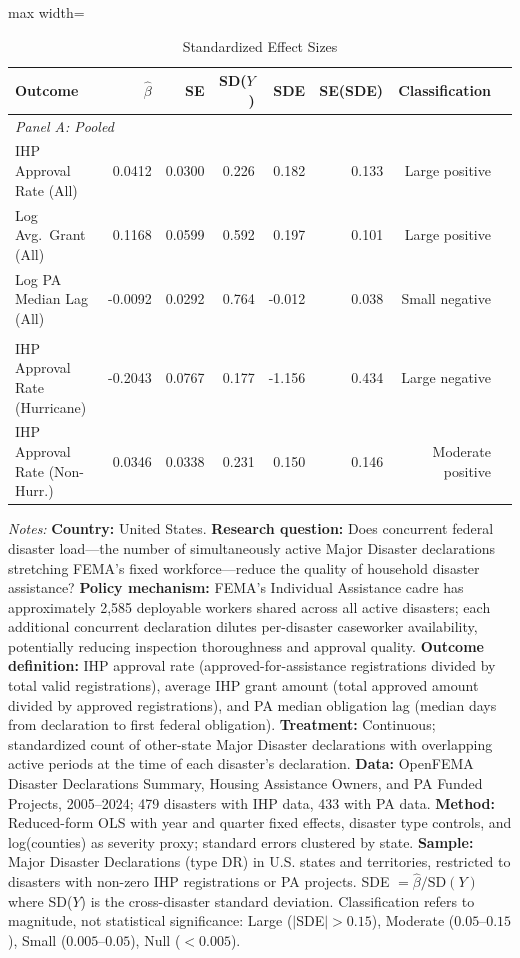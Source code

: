 \begin{table}[htbp]
\centering
\caption{Standardized Effect Sizes}
\label{tab:sde}
\small
\begin{adjustbox}{max width=\textwidth}
\begin{tabular}{lrrrrrrl}
\toprule
Outcome & $\hat{\beta}$ & SE & SD($Y$) & SDE & SE(SDE) & Classification \\
\midrule
\multicolumn{7}{l}{\textit{Panel A: Pooled}} \\
IHP Approval Rate (All) & 0.0412 & 0.0300 & 0.226 & 0.182 & 0.133 & Large positive \\
Log Avg.~Grant (All) & 0.1168 & 0.0599 & 0.592 & 0.197 & 0.101 & Large positive \\
Log PA Median Lag (All) & -0.0092 & 0.0292 & 0.764 & -0.012 & 0.038 & Small negative \\
\addlinespace
\multicolumn{7}{l}{\textit{Panel B: Heterogeneous (by disaster type)}} \\
IHP Approval Rate (Hurricane) & -0.2043 & 0.0767 & 0.177 & -1.156 & 0.434 & Large negative \\
IHP Approval Rate (Non-Hurr.) & 0.0346 & 0.0338 & 0.231 & 0.150 & 0.146 & Moderate positive \\
\bottomrule
\end{tabular}
\end{adjustbox}
\par\vspace{0.3em}
{\footnotesize \textit{Notes:} \textbf{Country:} United States. \textbf{Research question:} Does concurrent federal disaster load---the number of simultaneously active Major Disaster declarations stretching FEMA's fixed workforce---reduce the quality of household disaster assistance? \textbf{Policy mechanism:} FEMA's Individual Assistance cadre has approximately 2,585 deployable workers shared across all active disasters; each additional concurrent declaration dilutes per-disaster caseworker availability, potentially reducing inspection thoroughness and approval quality. \textbf{Outcome definition:} IHP approval rate (approved-for-assistance registrations divided by total valid registrations), average IHP grant amount (total approved amount divided by approved registrations), and PA median obligation lag (median days from declaration to first federal obligation). \textbf{Treatment:} Continuous; standardized count of other-state Major Disaster declarations with overlapping active periods at the time of each disaster's declaration. \textbf{Data:} OpenFEMA Disaster Declarations Summary, Housing Assistance Owners, and PA Funded Projects, 2005--2024; 479 disasters with IHP data, 433 with PA data. \textbf{Method:} Reduced-form OLS with year and quarter fixed effects, disaster type controls, and log(counties) as severity proxy; standard errors clustered by state. \textbf{Sample:} Major Disaster Declarations (type DR) in U.S. states and territories, restricted to disasters with non-zero IHP registrations or PA projects. SDE $= \hat{\beta} / \text{SD}(Y)$ where SD($Y$) is the cross-disaster standard deviation. Classification refers to magnitude, not statistical significance: Large ($|$SDE$| > 0.15$), Moderate ($0.05$--$0.15$), Small ($0.005$--$0.05$), Null ($< 0.005$).}
\end{table}
